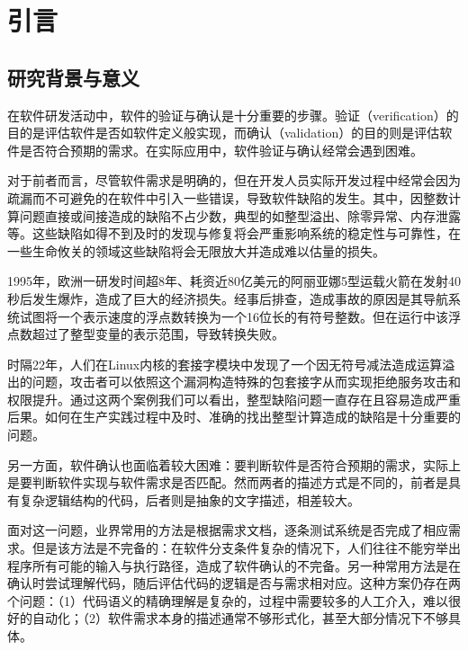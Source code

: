 
\chapter{引言}

 \section{研究背景与意义}
% 
%


在软件研发活动中，软件的验证与确认\cite{wagner2016functionally, wallace1989software}是十分重要的步骤。验证（verification）的目的是评估软件是否如软件定义般实现，而确认（validation）的目的则是评估软件是否符合预期的需求。在实际应用中，软件验证与确认经常会遇到困难。

对于前者而言，尽管软件需求是明确的，但在开发人员实际开发过程中经常会因为疏漏而不可避免的在软件中引入一些错误，导致软件缺陷的发生。其中，因整数计算问题直接或间接造成的缺陷不占少数，典型的如整型溢出、除零异常、内存泄露等。这些缺陷如得不到及时的发现与修复将会严重影响系统的稳定性与可靠性，在一些生命攸关的领域这些缺陷将会无限放大并造成难以估量的损失。

1995年，欧洲一研发时间超8年、耗资近80亿美元的阿丽亚娜5型运载火箭在发射40秒后发生爆炸，造成了巨大的经济损失。经事后排查，造成事故的原因是其导航系统试图将一个表示速度的浮点数转换为一个16位长的有符号整数。但在运行中该浮点数超过了整型变量的表示范围，导致转换失败。

时隔22年，人们在Linux内核的套接字模块中发现了一个因无符号减法造成运算溢出的问题，攻击者可以依照这个漏洞构造特殊的包套接字从而实现拒绝服务攻击和权限提升。通过这两个案例我们可以看出，整型缺陷问题一直存在且容易造成严重后果。如何在生产实践过程中及时、准确的找出整型计算造成的缺陷是十分重要的问题。

另一方面，软件确认也面临着较大困难\cite{wagner2013software}：要判断软件是否符合预期的需求，实际上是要判断软件实现与软件需求是否匹配。然而两者的描述方式是不同的，前者是具有复杂逻辑结构的代码，后者则是抽象的文字描述，相差较大。

面对这一问题，业界常用的方法是根据需求文档，逐条测试系统是否完成了相应需求\cite{ramler2006value}。但是该方法是不完备的：在软件分支条件复杂的情况下，人们往往不能穷举出程序所有可能的输入与执行路径，造成了软件确认的不完备。另一种常用方法是在确认时尝试理解代码，随后评估代码的逻辑是否与需求相对应。这种方案仍存在两个问题：（1）代码语义的精确理解是复杂的，过程中需要较多的人工介入\cite{ko2007information, murphy2006java, corbi1989program}，难以很好的自动化；（2）软件需求本身的描述通常不够形式化，甚至大部分情况下不够具体。

